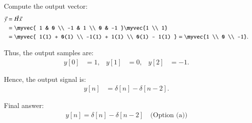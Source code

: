 \documentclass[journal]{IEEEtran}
\begin{document}
Compute the output vector:
\begin{align}
\vec{y} &= \vec{H}\vec{x} \nonumber \\
&= 
\myvec{
1 & 0 \\
-1 & 1 \\
0 & -1
}
\myvec{1 \\ 1} \nonumber \\
&= 
\myvec{
1(1) + 0(1) \\
-1(1) + 1(1) \\
0(1) - 1(1)
} =
\myvec{1 \\ 0 \\ -1}.
\end{align}

Thus, the output samples are:
\begin{align}
y[0] &= 1, &
y[1] &= 0, &
y[2] &= -1.
\end{align}

Hence, the output signal is:
\begin{align}
y[n] &= \delta[n] - \delta[n-2].
\end{align}

Final answer:
\begin{align}
\boxed{y[n] = \delta[n] - \delta[n-2] \quad \text{(Option (a))}}
\end{align}
\end{document}

